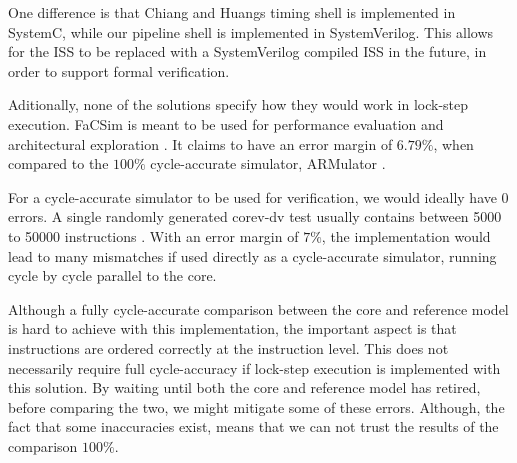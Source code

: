 One difference is that Chiang and Huangs timing shell is implemented in SystemC, while our pipeline shell is implemented in SystemVerilog. This allows for the ISS to be replaced with a SystemVerilog compiled ISS in the future, in order to support formal verification.  

Aditionally, none of the solutions specify how they would work in lock-step execution.
FaCSim is meant to be used for performance evaluation and architectural exploration \cite{leeFaCSimFastCycleAccurate2008}. It claims to have an error margin of $6.79 \%$, when compared to the $100 \%$ cycle-accurate simulator, ARMulator \cite{leeFaCSimFastCycleAccurate2008}.

For a cycle-accurate simulator to be used for verification, we would ideally have 0 errors. A single randomly generated corev-dv test usually contains between 5000 to 50000 instructions \cite{OpenhwgroupCv32e40s2024}. With an error margin of $7 \%$, the implementation would lead to many mismatches if used directly as a cycle-accurate simulator, running cycle by cycle parallel to the core. 

Although a fully cycle-accurate comparison between the core and reference model is hard to achieve with this implementation, the important aspect is that instructions are ordered correctly at the instruction level. This does not necessarily require full cycle-accuracy if lock-step execution is implemented with this solution. By waiting until both the core and reference model has retired, before comparing the two, we might mitigate some of these errors. Although, the fact that some inaccuracies exist, means that we can not trust the results of the comparison $100\%$.




